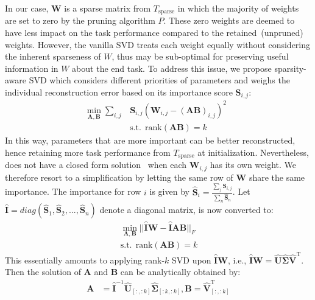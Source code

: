 In our case, $\bm{W}$ is a sparse matrix from $T_{\text{sparse}}$ in which the majority of weights are set to zero by the pruning algorithm $P$. These zero weights are deemed to have less impact on the task performance compared to the retained~(unpruned) weights. However, the vanilla SVD treats each weight equally without considering the inherent sparseness of $W$, thus may be sub-optimal for preserving useful information in $W$ about the end task.
To address this issue, we propose sparsity-aware SVD which considers different priorities of parameters and weighs the individual reconstruction error based on its importance score $\bm{S}_{i,j}$:
\begin{align}
	\min_{\bm{A},\bm{B}} \sum_{i,j}&\bm{S}_{i,j}(\bm{W}_{i,j}-(\bm{AB})_{i,j})^2~~~\\\
	 & \text{s.t.}~~\text{rank}(\bm{AB})=k
	\label{eq:sasvd}
\end{align}
In this way, parameters that are more important can be better reconstructed, hence retaining more task performance from $T_{\text{sparse}}$ at initialization. Nevertheless,  does not have a closed form solution~\cite{weightedsvd,hsu2021language} when each $\bm{W}_{i,j}$ has its own weight. We therefore resort to a simplification by letting the same row of $\bm{W}$ share the same importance. The importance for row $i$ is given by $\hat{\bm{S}}_{i}=\frac{\sum_{j}\bm{S}_{i,j}}{\sum_{n}\hat{\bm{S}}_{n}}$. Let $\hat{\bm{I}}=diag(\hat{\bm{S}}_1,\hat{\bm{S}}_2,...,\hat{\bm{S}}_{n})$ denote a diagonal matrix,   is now converted to:
\begin{align}
	&\min_{\bm{A},\bm{B}}||\hat{\bm{I}}\bm{W}-\hat{\bm{I}}\bm{A}\bm{B}||_F~~~~
	\\
	& \text{s.t.}~~\text{rank}(\bm{AB})=k
\end{align}
This essentially amounts to applying rank-$k$ SVD upon $\hat{\bm{I}}\bm{W}$, i.e., $\hat{\bm{I}}\bm{W}=\hat{\bm{U}}\hat{\bm{\Sigma}}\hat{\bm{V}}^\mathrm{T}$. Then the solution of $\bm{A}$ and $\bm{B}$ can be analytically obtained by:
\begin{align}
	\bm{A} &= \hat{\bm{I}}^{-1}\hat{\bm{U}}_{[:,:k]}\hat{\bm{\Sigma}}_{[:k,:k]},\bm{B}=\hat{\bm{V}}_{[:,:k]}^{\mathrm{T}}
\end{align}


